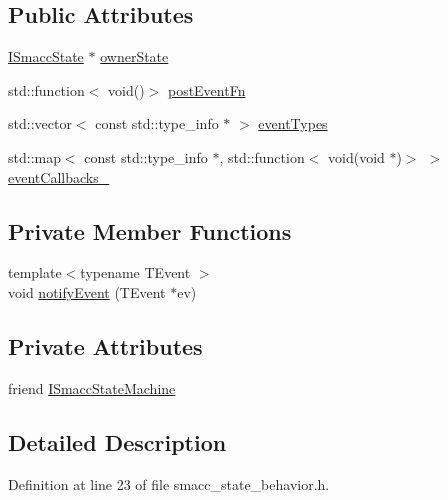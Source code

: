 \subsection*{Public Attributes}
\begin{DoxyCompactItemize}
\item 
\hyperlink{classsmacc_1_1ISmaccState}{I\+Smacc\+State} $\ast$ \hyperlink{classsmacc_1_1StateBehavior_abdc8c883baf520fd01f98e046d045dca}{owner\+State}
\item 
std\+::function$<$ void()$>$ \hyperlink{classsmacc_1_1StateBehavior_aa8485f8a68716ca9429ac8e72e057b7c}{post\+Event\+Fn}
\item 
std\+::vector$<$ const std\+::type\+\_\+info $\ast$ $>$ \hyperlink{classsmacc_1_1StateBehavior_a2df8158ebc3bb0f82c55824f088288bb}{event\+Types}
\item 
std\+::map$<$ const std\+::type\+\_\+info $\ast$, std\+::function$<$ void(void $\ast$)$>$ $>$ \hyperlink{classsmacc_1_1StateBehavior_acbe54c0be9466094565c5b47ab53d84b}{event\+Callbacks\+\_\+}
\end{DoxyCompactItemize}
\subsection*{Private Member Functions}
\begin{DoxyCompactItemize}
\item 
{\footnotesize template$<$typename T\+Event $>$ }\\void \hyperlink{classsmacc_1_1StateBehavior_a9307fb59a1d8bf490d280b8660a13c09}{notify\+Event} (T\+Event $\ast$ev)
\end{DoxyCompactItemize}
\subsection*{Private Attributes}
\begin{DoxyCompactItemize}
\item 
friend \hyperlink{classsmacc_1_1StateBehavior_a4bc03d3369b90283c91d7046461a554a}{I\+Smacc\+State\+Machine}
\end{DoxyCompactItemize}


\subsection{Detailed Description}


Definition at line 23 of file smacc\+\_\+state\+\_\+behavior.\+h.



